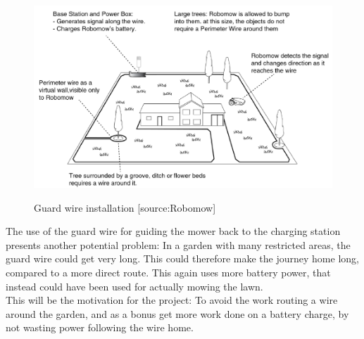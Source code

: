  
\begin{figure}[H]
\centering
\includegraphics[scale=0.6]{figures/robomow.png} 
\label{fig:robomow}
\caption{Guard wire installation [source:Robomow]} 
\end{figure}
\noindent

The use of the guard wire for guiding the mower back to the charging station presents another potential problem: In a garden with many restricted areas, the guard wire could get very long. This could therefore make the journey home long, compared to a more direct route. This again uses more battery power, that instead could have been used for actually mowing the lawn.\\

\noindent
This will be the motivation for the project: To avoid the work routing a wire around the garden, and as a bonus get more work done on a battery charge, by not wasting power following the wire home. 
    
